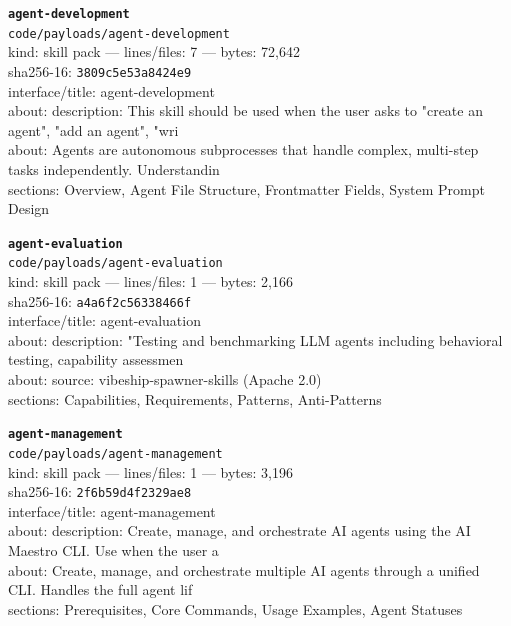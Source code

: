 \noindent\textbf{\texttt{agent-development}}\\
\texttt{code/payloads/agent-development}\\
kind: skill pack --- lines/files: 7 --- bytes: 72,642\\
sha256-16: \texttt{3809c5e53a8424e9}\\
interface/title: agent-development\\
about: description: This skill should be used when the user asks to "create an agent", "add an agent", "wri\\
about: Agents are autonomous subprocesses that handle complex, multi-step tasks independently. Understandin\\
sections: Overview, Agent File Structure, Frontmatter Fields, System Prompt Design\\
\vspace*{6.0pt}
\newpage

\noindent\textbf{\texttt{agent-evaluation}}\\
\texttt{code/payloads/agent-evaluation}\\
kind: skill pack --- lines/files: 1 --- bytes: 2,166\\
sha256-16: \texttt{a4a6f2c56338466f}\\
interface/title: agent-evaluation\\
about: description: "Testing and benchmarking LLM agents including behavioral testing, capability assessmen\\
about: source: vibeship-spawner-skills (Apache 2.0)\\
sections: Capabilities, Requirements, Patterns, Anti-Patterns\\
\vspace*{6.0pt}

\noindent\textbf{\texttt{agent-management}}\\
\texttt{code/payloads/agent-management}\\
kind: skill pack --- lines/files: 1 --- bytes: 3,196\\
sha256-16: \texttt{2f6b59d4f2329ae8}\\
interface/title: agent-management\\
about: description: Create, manage, and orchestrate AI agents using the AI Maestro CLI. Use when the user a\\
about: Create, manage, and orchestrate multiple AI agents through a unified CLI. Handles the full agent lif\\
sections: Prerequisites, Core Commands, Usage Examples, Agent Statuses\\
\vspace*{6.0pt}

